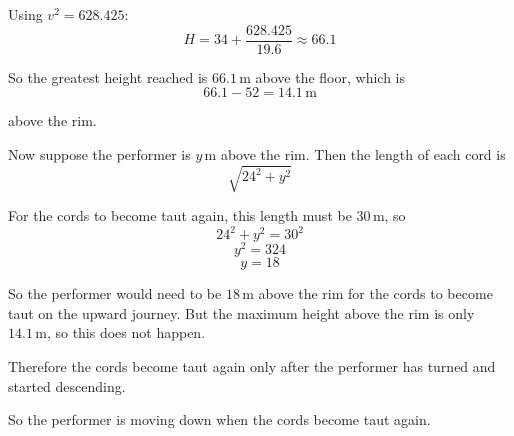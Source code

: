 \documentclass[leqno]{article}
\begin{document}
\begin{enumerate}[
  label=\textbf{\arabic*.},
  leftmargin=*,
  topsep=0pt,
  partopsep=0pt,
  parsep=0pt
]
\begin{djsSolution}
\begin{enumerate}[label=\textbf{(\alph*)}, start=1]
Using $v^2=628.425$:
\[
H=34+\frac{628.425}{19.6}\approx 66.1
\]

So the greatest height reached is $66.1\,\mathrm{m}$ above the floor, which is
\[
66.1-52=14.1\,\mathrm{m}
\]

above the rim.

Now suppose the performer is $y\,\mathrm{m}$ above the rim. Then the length of each cord is
\[
\sqrt{24^2+y^2}
\]

For the cords to become taut again, this length must be $30\,\mathrm{m}$, so
\[
24^2+y^2=30^2
\]
\[
y^2=324
\]
\[
y=18
\]

So the performer would need to be $18\,\mathrm{m}$ above the rim for the cords to become taut on the upward journey.
But the maximum height above the rim is only $14.1\,\mathrm{m}$, so this does not happen.

Therefore the cords become taut again only after the performer has turned and started descending.

So the performer is moving down when the cords become taut again.
\end{enumerate}
\end{djsSolution}


\end{enumerate}
\end{document}
